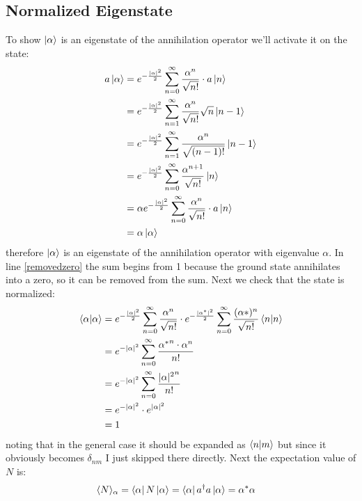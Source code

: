 \subsection{Normalized Eigenstate}
To show $\ket{\alpha}$ is an eigenstate of the annihilation operator we'll activate it on the state:
\begin{align}
	a\ket{\alpha} &= e^{-\frac{\lvert\alpha\rvert^2}{2}}\sum\limits_{n=0}^\infty\frac{\alpha^n}{\sqrt{n!}}\cdot a\ket{n}\\
	&= e^{-\frac{\lvert\alpha\rvert^2}{2}}\sum\limits_{n=1}^\infty\frac{\alpha^n}{\sqrt{n!}}\sqrt{n}\ket{n-1}\label{removedzero}\\
	&= e^{-\frac{\lvert\alpha\rvert^2}{2}}\sum\limits_{n=1}^\infty\frac{\alpha^n}{\sqrt{(n-1)!}}\ket{n-1}\\
	&= e^{-\frac{\lvert\alpha\rvert^2}{2}}\sum\limits_{n=0}^\infty\frac{\alpha^{n+1}}{\sqrt{n!}}\ket{n}\\
	&= \alpha e^{-\frac{\lvert\alpha\rvert^2}{2}}\sum\limits_{n=0}^\infty\frac{\alpha^n}{\sqrt{n!}}\cdot a\ket{n}\\
	&= \alpha \ket{\alpha}
\end{align}
therefore $\ket{\alpha}$ is an eigenstate of the annihilation operator with eigenvalue $\alpha$. In line \ref{removedzero} the sum begins from 1 because the ground state annihilates into a zero, so it can be removed from the sum. Next we check that the state is normalized:
\begin{align}
	\braket{\alpha\vert\alpha} &= e^{-\frac{\lvert\alpha\rvert^2}{2}}\sum\limits_{n=0}^\infty\frac{\alpha^n}{\sqrt{n!}}\cdot e^{-\frac{\lvert\alpha^*\rvert^2}{2}}\sum\limits_{n=0}^\infty\frac{(\alpha*)^n}{\sqrt{n!}}\braket{n\vert n}\\
	&= e^{-\lvert\alpha\rvert^2}\sum\limits_{n=0}^\infty\frac{{\alpha^*}^n\cdot\alpha^n}{n!}\\
	&= e^{-\lvert\alpha\rvert^2}\sum\limits_{n=0}^\infty\frac{{\lvert\alpha\rvert^2}^n}{n!}\\
	&= e^{-\lvert\alpha\rvert^2}\cdot e^{\lvert\alpha\rvert^2}\\
	&= 1
\end{align}
noting that in the general case it should be expanded as $\braket{n\vert m}$ but since it obviously becomes $\delta_{nm}$ I just skipped there directly. Next the expectation value of $N$ is:
\begin{align}
	\langle N\rangle_\alpha &= \bra{\alpha}N\ket{\alpha}
	= \bra{\alpha}a^\dagger a\ket{\alpha}
	= \alpha^*\alpha
\end{align}
